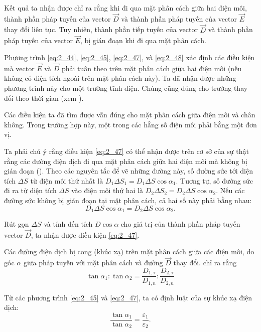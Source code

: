 Kết quả ta nhận được chỉ ra rằng khi đi qua mặt phân cách giữa hai điện môi, thành phần pháp tuyến của vector $\vec{D}$ và thành phần pháp tuyến của vector $\vec{E}$ thay đổi liên tục. Tuy nhiên, thành phần tiếp tuyến của vector $\vec{D}$ và thành phần
pháp tuyến của vector $\vec{E}$, bị gián đoạn khi đi qua mặt phân cách.

Phương trình \eqref{eq:2_44}, \eqref{eq:2_45}, \eqref{eq:2_47}, và \eqref{eq:2_48} xác định các điều kiện mà vector $\vec{E}$ và $\vec{D}$ phải tuân theo trên mặt phân cách giữa hai điện môi (nếu không có điện tích ngoài trên mặt phân cách này). Ta đã nhận được những phương trình này cho một trường tĩnh điện. Chúng cũng đúng cho trường thay đổi theo thời gian (xem
).

Các điều kiện ta đã tìm được vẫn đúng cho mặt phân cách giữa điện môi và chân không. Trong trường hợp này, một trong các hằng số điện môi phải bằng một đơn vị.

Ta phải chú ý rằng điều kiện \eqref{eq:2_47} có thể nhận được trên cơ sở của sự thật rằng các đường điện dịch đi qua mặt phân cách giữa hai điện môi mà không bị gián đoạn (). Theo
các nguyên tắc để vẽ những đường này, số đường sức tới diện tích $\Delta{S}$ từ điện môi thứ nhất là $D_1\Delta{S}_1=D_1\Delta{S}\cos\alpha_1$. Tương tự, số đường sức đi ra từ diện tích $\Delta{S}$ vào điện môi thứ hai là $D_2\Delta{S}_2=D_2\Delta{S}\cos\alpha_2$. Nếu các đường sức không bị gián đoạn tại mặt phân cách, cả hai số này phải bằng nhau:
\begin{equation*}
    D_1\Delta{S}\cos\alpha_1 = D_2\Delta{S}\cos\alpha_2.
\end{equation*}

\noindent
Rút gọn $\Delta{S}$ và tính đến tích $D\cos\alpha$ cho giá trị của thành phần pháp tuyến vector $\vec{D}$, ta nhận được điều kiện \eqref{eq:2_47}.

Các đường điện dịch bị cong (khúc xạ) trên mặt phân cách giữa các điện môi, do góc $\alpha$ giữa pháp tuyến với mặt phân cách và đường $\vec{D}$ thay đổi.  chỉ ra rằng
\begin{equation*}
    \tan\alpha_1 : \tan\alpha_2 = \frac{D_{1,\tau}}{D_{1,n}} : \frac{D_{2,\tau}}{D_{2,n}}
\end{equation*}

\noindent
Từ các phương trình \eqref{eq:2_45} và \eqref{eq:2_47}, ta có định luật của sự khúc xạ điện dịch:
\begin{equation}\label{eq:2_49}
    \frac{\tan\alpha_1}{\tan\alpha_2} = \frac{\varepsilon_1}{\varepsilon_2}.
\end{equation}

